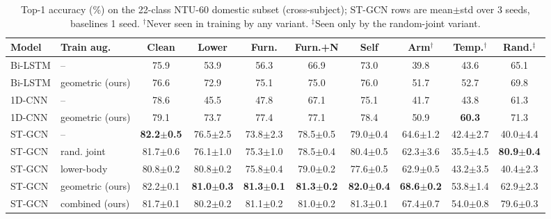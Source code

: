 \begin{table}[t]
\centering\small
\setlength{\tabcolsep}{4pt}
\begin{tabular}{@{}llcccccccc@{}}
\toprule
Model & Train aug. & Clean & Lower & Furn. & Furn.+N & Self & Arm$^\dagger$ & Temp.$^\dagger$ & Rand.$^\ddagger$ \\
\midrule
Bi-LSTM & -- & 75.9 & 53.9 & 56.3 & 66.9 & 73.0 & 39.8 & 43.6 & 65.1 \\
Bi-LSTM & geometric (ours) & 76.6 & 72.9 & 75.1 & 75.0 & 76.0 & 51.7 & 52.7 & 69.8 \\
1D-CNN & -- & 78.6 & 45.5 & 47.8 & 67.1 & 75.1 & 41.7 & 43.8 & 61.3 \\
1D-CNN & geometric (ours) & 79.1 & 73.7 & 77.4 & 77.1 & 78.4 & 50.9 & \textbf{60.3} & 71.3 \\
ST-GCN & -- & \textbf{82.2$\pm$0.5} & 76.5$\pm$2.5 & 73.8$\pm$2.3 & 78.5$\pm$0.5 & 79.0$\pm$0.4 & 64.6$\pm$1.2 & 42.4$\pm$2.7 & 40.0$\pm$4.4 \\
ST-GCN & rand. joint & 81.7$\pm$0.6 & 76.1$\pm$1.0 & 75.3$\pm$1.0 & 78.5$\pm$0.4 & 80.4$\pm$0.5 & 62.3$\pm$3.6 & 35.5$\pm$4.5 & \textbf{80.9$\pm$0.4} \\
ST-GCN & lower-body & 80.8$\pm$0.2 & 80.8$\pm$0.2 & 75.8$\pm$0.4 & 79.0$\pm$0.2 & 77.6$\pm$0.5 & 62.9$\pm$0.5 & 43.2$\pm$3.5 & 40.4$\pm$2.3 \\
ST-GCN & geometric (ours) & 82.2$\pm$0.1 & \textbf{81.0$\pm$0.3} & \textbf{81.3$\pm$0.1} & \textbf{81.3$\pm$0.2} & \textbf{82.0$\pm$0.4} & \textbf{68.6$\pm$0.2} & 53.8$\pm$1.4 & 62.9$\pm$2.3 \\
ST-GCN & combined (ours) & 81.7$\pm$0.1 & 80.2$\pm$0.2 & 81.1$\pm$0.2 & 81.0$\pm$0.2 & 81.3$\pm$0.1 & 67.4$\pm$0.7 & 54.0$\pm$0.8 & 79.6$\pm$0.3 \\
\bottomrule
\end{tabular}
\caption{Top-1 accuracy (\%) on the 22-class NTU-60 domestic subset (cross-subject); ST-GCN rows are mean$\pm$std over 3 seeds, baselines 1 seed. $^\dagger$Never seen in training by any variant. $^\ddagger$Seen only by the random-joint variant.}
\label{tab:results}
\end{table}

